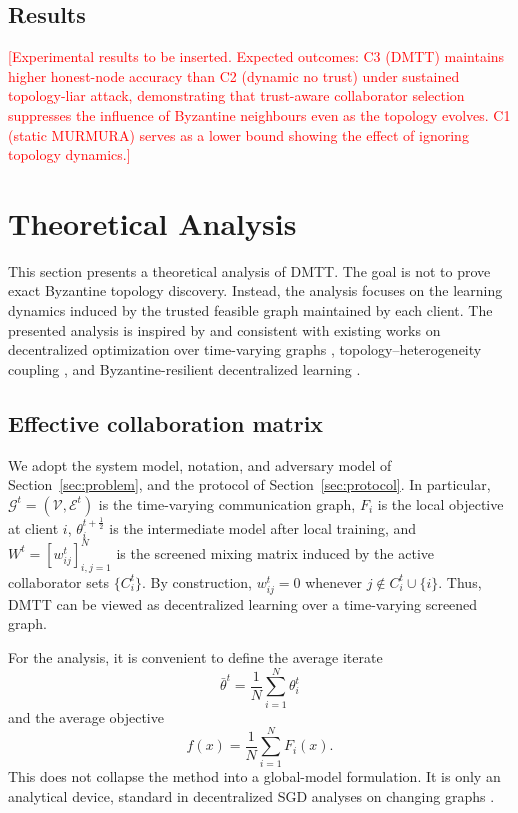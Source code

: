 \documentclass[journal]{IEEEtran}
\newenvironment{added}{\begingroup\color{addedcolor}}{\endgroup}
\theoremstyle{definition}
\theoremstyle{remark}
\begin{document}
\begin{added}
\subsection{Results}

\textcolor{red}{[Experimental results to be inserted. Expected outcomes: C3 (DMTT) maintains higher honest-node accuracy than C2 (dynamic no trust) under sustained topology-liar attack, demonstrating that trust-aware collaborator selection suppresses the influence of Byzantine neighbours even as the topology evolves. C1 (static MURMURA) serves as a lower bound showing the effect of ignoring topology dynamics.]}
\end{added}

\section{Theoretical Analysis}
\label{sec:theory}

This section presents a theoretical analysis of DMTT. The goal is not to prove exact Byzantine topology discovery. Instead, the analysis focuses on the learning dynamics induced by the trusted feasible graph maintained by each client. The presented analysis is inspired by and consistent with existing works on decentralized optimization over time-varying graphs \cite{koloskova2020unified, nedic2014distributed, 7405263}, topology--heterogeneity coupling \cite{le2023refined}, and Byzantine-resilient decentralized learning \cite{he2022byzantine, 10208131}.

\subsection{Effective collaboration matrix}

We adopt the system model, notation, and adversary model of Section~\ref{sec:problem}, and the protocol of Section~\ref{sec:protocol}. In particular, $\mathcal G^t=(\mathcal V,\mathcal E^t)$ is the time-varying communication graph, $F_i$ is the local objective at client $i$, $\theta_i^{t+\frac12}$ is the intermediate model after local training, and $W^t=[w_{ij}^t]_{i,j=1}^N$ is the screened mixing matrix induced by the active collaborator sets $\{C_i^t\}$. By construction, $w_{ij}^t=0$ whenever $j\notin C_i^t\cup\{i\}$. Thus, DMTT can be viewed as decentralized learning over a time-varying screened graph.

For the analysis, it is convenient to define the average iterate
$$
\bar{\theta}^t = \frac{1}{N}\sum_{i=1}^N \theta_i^t
$$
and the average objective
$$
f(x)=\frac{1}{N}\sum_{i=1}^N F_i(x).
$$
This does not collapse the method into a global-model formulation. It is only an analytical device, standard in decentralized SGD analyses on changing graphs \cite{koloskova2020unified, nedic2014distributed, 7405263}.
\end{document}
